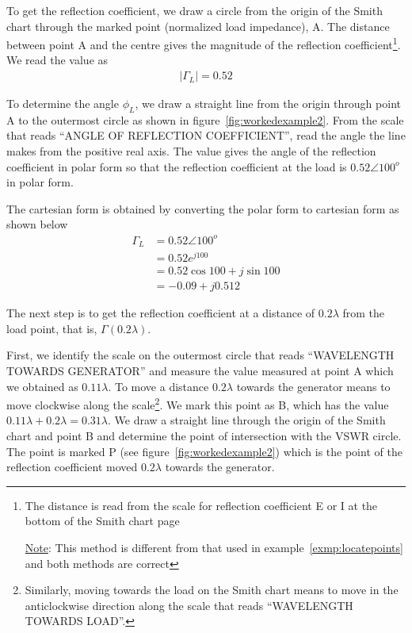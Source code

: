 \begin{exmp}
To get the reflection coefficient, we draw a circle from the origin of the Smith chart through the marked point (normalized load impedance), A. The distance between point A and the centre gives the magnitude of the reflection coefficient\footnote{
The distance is read from the scale for reflection coefficient E or I at the bottom of the Smith chart page

\underline{Note}: This method is different from that used in example~\ref{exmp:locatepoints} and both methods are correct
}. We read the value as
\begin{align*}
|\Gamma_{L}| = 0.52
\end{align*}

To determine the angle $\phi_{L}$, we draw a straight line from the origin through point A to the outermost circle as shown in figure~\ref{fig:workedexample2}. From the scale that reads \textquotedblleft ANGLE OF REFLECTION COEFFICIENT\textquotedblright\;, read the angle the line makes from the positive real axis. The value gives the angle of the reflection coefficient in polar form so that the reflection coefficient at the load is $0.52\angle100^o$ in polar form.

The cartesian form is obtained by converting the polar form to cartesian form as shown below
\begin{align*}
\Gamma_{L} &= 0.52\angle100^o\\
&= 0.52e^{j100}\\
&= 0.52{\cos100 + j\sin100}\\
&= -0.09+j0.512
\end{align*}

The next step is to get the reflection coefficient at a distance of $0.2\lambda$ from the load point, that is, $\Gamma(0.2\lambda)$. 

First, we identify the scale on the outermost circle that reads \textquotedblleft WAVELENGTH TOWARDS GENERATOR\textquotedblright\; and measure the value measured at point A which we obtained as $0.11\lambda$. To move a distance $0.2\lambda$ towards the generator means to move clockwise along the scale\footnote{
Similarly, moving towards the load on the Smith chart means to move in the anticlockwise direction along the scale that reads \textquotedblleft WAVELENGTH TOWARDS LOAD\textquotedblright\;.
}. We mark this point as B, which has the value $0.11\lambda + 0.2\lambda=0.31\lambda$. We draw a straight line through the origin of the Smith chart and point B and determine the point of intersection with the VSWR circle. The point is marked P (see figure~\ref{fig:workedexample2}) which is the point of the reflection coefficient moved $0.2\lambda$ towards the generator. 


\end{exmp}
